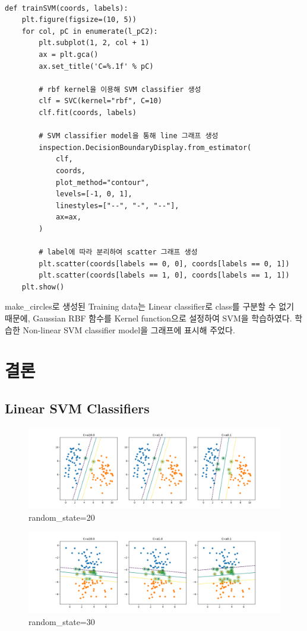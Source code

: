 \documentclass[]{report}
\begin{document}
\begin{lstlisting}

def trainSVM(coords, labels):
	plt.figure(figsize=(10, 5))
	for col, pC in enumerate(l_pC2):
		plt.subplot(1, 2, col + 1)
		ax = plt.gca()
		ax.set_title('C=%.1f' % pC)

		# rbf kernel을 이용해 SVM classifier 생성
		clf = SVC(kernel="rbf", C=10)
		clf.fit(coords, labels)

		# SVM classifier model을 통해 line 그래프 생성
		inspection.DecisionBoundaryDisplay.from_estimator(
			clf,
			coords,
			plot_method="contour",
			levels=[-1, 0, 1],
			linestyles=["--", "-", "--"],
			ax=ax,
		)

		# label에 따라 분리하여 scatter 그래프 생성
		plt.scatter(coords[labels == 0, 0], coords[labels == 0, 1])
		plt.scatter(coords[labels == 1, 0], coords[labels == 1, 1])
	plt.show()

\end{lstlisting}

make\_circles로 생성된 Training data는 Linear classifier로 class를 구분할 수 없기 때문에, 
Gaussian RBF 함수를 Kernel function으로 설정하여 SVM을 학습하였다.  
학습한 Non-linear SVM classifier model을 그래프에 표시해 주었다. \\


\chapter{결론}

\section{Linear SVM Classifiers}

\begin{figure}[ht!]
    \centering
    \includegraphics[width=1\textwidth]{image/1-1.png}
    \caption{random\_state=20}
    \label{1-1}
\end{figure}

\begin{figure}[ht!]
    \centering
    \includegraphics[width=1\textwidth]{image/1-2.png}
    \caption{random\_state=30}
    \label{1-2}
\end{figure}
\end{document}
